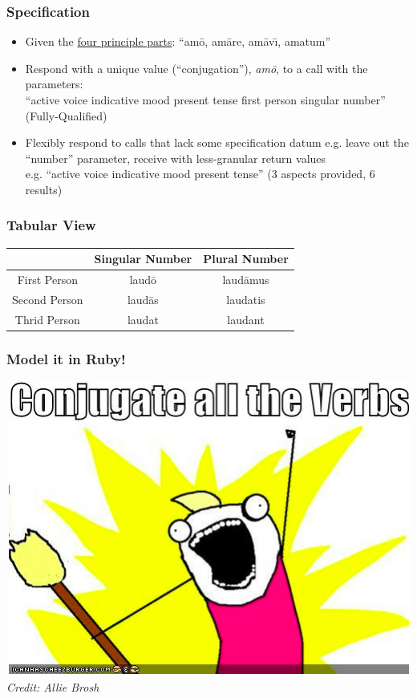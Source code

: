\documentclass[slidestop,compress,mathserif]{beamer}
\begin{document}
\begin{frame}
	\frametitle{Specification}
	\begin{itemize}
		\item Given the \underline{four principle parts}:  ``am\={o}, am\={a}re, am\={a}v\={\i}, amatum''
		\pause
		\item Respond with a unique value (``conjugation''), \emph{am\={o}}, to a call with the parameters: \\
		``active voice indicative mood present tense first person singular number'' (Fully-Qualified)
		\pause
		\item Flexibly respond to calls that lack some specification datum e.g. leave out the ``number'' parameter, receive with less-granular return values\\
          e.g. ``active voice indicative mood present tense'' (3 aspects provided, 6 results)
	\end{itemize}
\end{frame}

\begin{frame}
	\frametitle{Tabular View}
	\begin{center}
		\begin{tabular}{|c|c|c|}
			\hline
			  & Singular Number &  Plural Number\\
			\hline
			First Person  & laud\={o}  & laud\={a}mus\\
			Second Person & laud\={a}s & laudatis \\
			Thrid Person  & laudat     & laudant \\
			\hline
		\end{tabular}
	\end{center}
\end{frame}

\begin{frame}
	\frametitle{Model it in Ruby!}
	\begin{center}
		\includegraphics[scale=0.45]{img/brosh_all.png}
		\vskip 0.5cm
		\emph{Credit:  Allie Brosh}
	\end{center}
\end{frame}
\end{document}
